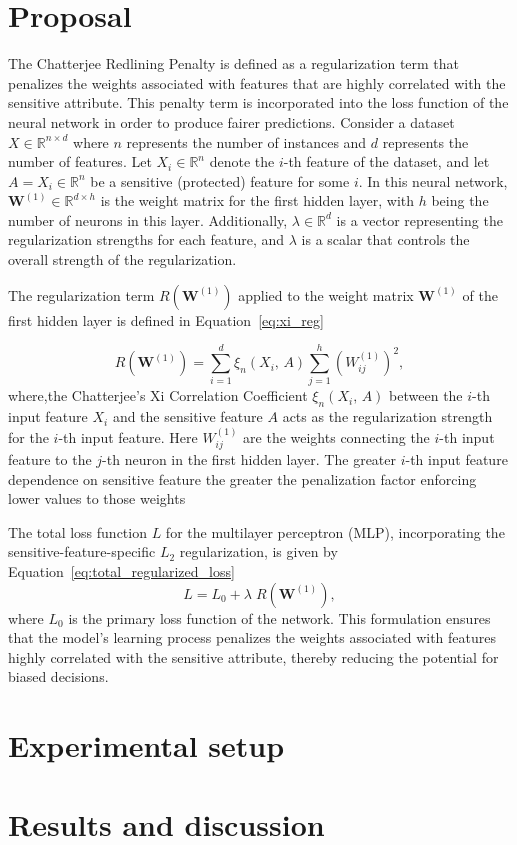 \section{Proposal}

The Chatterjee Redlining Penalty is defined as a regularization term that penalizes the weights associated with features that are highly correlated with the sensitive attribute. This penalty term is incorporated into the loss function of the neural network in order to produce fairer predictions. Consider a dataset \(X \in \mathbb{R}^{n \times d}\) where \(n\) represents the number of instances and \(d\) represents the number of features. Let \(X_i \in \mathbb{R}^n\) denote the \(i\)-th feature of the dataset, and let \(A = X_i \in \mathbb{R}^n\) be a sensitive (protected) feature for some \(i\). In this neural network, \(\mathbf{W}^{(1)} \in \mathbb{R}^{d \times h}\) is the weight matrix for the first hidden layer, with \(h\) being the number of neurons in this layer. Additionally, \(\lambda \in \mathbb{R}^d\) is a vector representing the regularization strengths for each feature, and $\lambda$ is a scalar that controls the overall strength of the regularization.



The regularization term \(R(\mathbf{W}^{(1)})\) applied to the weight matrix \(\mathbf{W}^{(1)}\) of the first hidden layer is defined in Equation~\ref{eq:xi_reg}

\begin{equation}\label{eq:xi_reg}
R(\mathbf{W}^{(1)}) = \sum_{i=1}^d \xi_n(X_i,\,A) \sum_{j=1}^h (W^{(1)}_{ij})^2,
\end{equation}
where,the Chatterjee's Xi Correlation Coefficient  $\xi_n(X_i,\,A)$  between the $i$-th input feature $X_i$ and the sensitive feature $A$ acts as the regularization strength for the $i$-th input feature. Here $W^{(1)}_{ij}$ are the weights connecting the $i$-th input feature to the $j$-th neuron in the first hidden layer. The greater $i$-th input feature dependence on sensitive feature the greater the penalization factor enforcing lower values to those weights

The total loss function \(L\) for the multilayer perceptron (MLP), incorporating the sensitive-feature-specific \(L_2\) regularization, is given by Equation~\ref{eq:total_regularized_loss}
\begin{equation}\label{eq:total_regularized_loss}
L = L_0 + \lambda \; R(\mathbf{W}^{(1)}),
\end{equation}
where $L_0$ is the primary loss function of the network. This formulation ensures that the model's learning process penalizes the weights associated with features highly correlated with the sensitive attribute, thereby reducing the potential for biased decisions.


\section{Experimental setup}

\section{Results and discussion}
